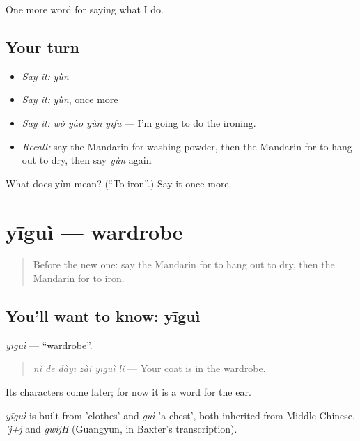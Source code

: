 \begin{grammarlens}[title={What you've built}]
One more word for saying what I do.
\end{grammarlens}

\subsection*{Your turn}
\begin{itemize}
\raggedright
  \item \emph{Say it:} \emph{yùn}
  \item \emph{Say it:} \emph{yùn}, once more
  \item \emph{Say it:} \emph{wǒ yào yùn yīfu} — I'm going to do the ironing.
  \item \emph{Recall:} say the Mandarin for washing powder, then the Mandarin for to hang out to dry, then say \emph{yùn} again
\end{itemize}

\begin{tcolorbox}[breakable,colback=teal!4,colframe=teal!35!black,title={Before you move on}]
What does yùn mean? (\textquotedblleft{}To iron\textquotedblright{}.) Say it once more.
\end{tcolorbox}
\section[yīguì]{yīguì — wardrobe}

\label{lesson:ZH-C179-yigui}



\begin{quote}
Before the new one: say the Mandarin for to hang out to dry, then the Mandarin for to iron.
\end{quote}

\subsection*{You'll want to know: yīguì}
\emph{yīguì} — \textquotedblleft{}wardrobe\textquotedblright{}.

\begin{quote}
\emph{nǐ de dàyī zài yīguì lǐ} — Your coat is in the wardrobe.
\end{quote}

Its characters come later; for now it is a word for the ear.

\begin{cousinweb}
\emph{yīguì} is built from  'clothes' and \emph{guì} 'a chest', both inherited from Middle Chinese, \emph{'j+j} and \emph{gwijH} (Guangyun, in Baxter's transcription).
\end{cousinweb}

